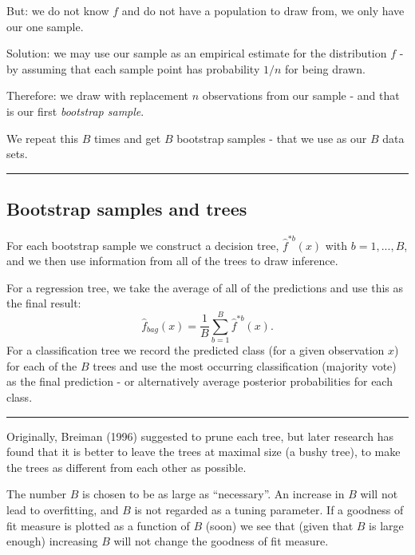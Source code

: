 \documentclass[]{article}
\begin{document}
But: we do not know \(f\) and do not have a population to draw from, we
only have our one sample.

Solution: we may use our sample as an empirical estimate for the
distribution \(f\) - by assuming that each sample point has probability
\(1/n\) for being drawn.

Therefore: we draw with replacement \(n\) observations from our sample -
and that is our first \emph{bootstrap sample}.

We repeat this \(B\) times and get \(B\) bootstrap samples - that we use
as our \(B\) data sets.

\begin{center}\rule{0.5\linewidth}{\linethickness}\end{center}

\hypertarget{bootstrap-samples-and-trees}{%
\subsection{Bootstrap samples and
trees}\label{bootstrap-samples-and-trees}}

For each bootstrap sample we construct a decision tree,
\(\hat{f}^{*b}(x)\) with \(b=1,...,B\), and we then use information from
all of the trees to draw inference.

For a regression tree, we take the average of all of the predictions and
use this as the final result: \[
\hat{f}_{bag}(x)=\frac{1}{B}\sum_{b=1}^B \hat{f}^{*b}(x).
\] For a classification tree we record the predicted class (for a given
observation \(x\)) for each of the \(B\) trees and use the most
occurring classification (majority vote) as the final prediction - or
alternatively average posterior probabilities for each class.

\begin{center}\rule{0.5\linewidth}{\linethickness}\end{center}

Originally, Breiman (1996) suggested to prune each tree, but later
research has found that it is better to leave the trees at maximal size
(a bushy tree), to make the trees as different from each other as
possible.

The number \(B\) is chosen to be as large as ``necessary''. An increase
in \(B\) will not lead to overfitting, and \(B\) is not regarded as a
tuning parameter. If a goodness of fit measure is plotted as a function
of \(B\) (soon) we see that (given that \(B\) is large enough)
increasing \(B\) will not change the goodness of fit measure.
\end{document}
